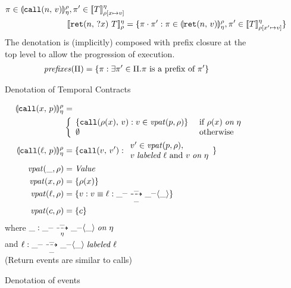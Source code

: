 \documentclass[preprint,onecolumn,9pt]{sigplanconf} %
\begin{document}
\begin{figure}
\begin{align*}
            {\mtrace \in \denoteevent{\scallev{\mname}{\mval}}{\mtimeline}{\menv},
             \mtrace' \in \denotetcon{\mtcon}{\mtimeline}{\menv[\mvar \mapsto \mval]}}
\\
   \denotetcon{\stret{\mname}{\mvar}{\mtcon}}{\mtimeline}{\menv} &=
   \setbuild{\mtrace\cdot \mtrace'}
            {\mtrace \in \denoteevent{\sretev{\mname}{\mval}}{\mtimeline}{\menv},
             \mtrace' \in \denotetcon{\mtcon}{\mtimeline}{\menv[\mvar' \mapsto \mval]}}
  \end{align*}
  The denotation is (implicitly) composed with prefix closure at the top level to allow the progression of execution.
  \begin{align*}
    \mathit{prefixes}(\Pi) &= \{\pi : \exists \pi' \in \Pi. \pi \text{ is a prefix of } \pi'\}
  \end{align*}
  \caption{Denotation of Temporal Contracts}
  \label{fig:tcontract-denotation}
\end{figure}

\begin{figure}
  \begin{align*}
    \llparenthesis {\tt call}(x,\, p) \rrparenthesis_{\eta}^{\rho} &= \\
    &\left\{\begin{array}{ll}
           \{{\tt call}(\rho(x),\,v) : v \in \mathit{vpat}(p, \rho)\} &\text{ if } \rho(x) \mathrel{\mathit{on}} \eta \\
           \emptyset & \text{ otherwise}
           \end{array}\right.
\\
    \llparenthesis {\tt call}(\ell,\, p) \rrparenthesis_{\eta}^{\rho} &=
      \{{\tt call}(v,\,v') : 
        \begin{array}{l}
v' \in \mathit{vpat}(p, \rho),\\
 v \mathrel{\mathit{labeled}} \ell \text{ and } v \mathrel{\mathit{on}} \eta
\end{array}
\}
\\
   \mathit{vpat}(\_, \rho) &= \mathit{Value}
\\
   \mathit{vpat}(x, \rho) &= \{\rho(x)\}
\\
   \mathit{vpat}(\ell, \rho) &= \{v : v \equiv \ell : \_^{\_} \overset{\_}{\underset{\_}{\dashrightarrow}} \_^{\_} \langle\_\rangle\}
\\
   \mathit{vpat}(c, \rho) &= \{c\}
  \end{align*}
  where $\_ : \_^{\_} \overset{\_}{\underset{\eta}{\dashrightarrow}} \_^{\_} \langle\_\rangle \mathrel{\mathit{on}} \eta$ \\
  and $\ell : \_^{\_} \overset{\_}{\underset{\_}{\dashrightarrow}} \_^{\_} \langle\_\rangle \mathrel{\mathit{labeled}} \ell$ \\
  (Return events are similar to calls)
  \caption{Denotation of events}
  \label{fig:event-denotation}
\end{figure}
\end{document}

